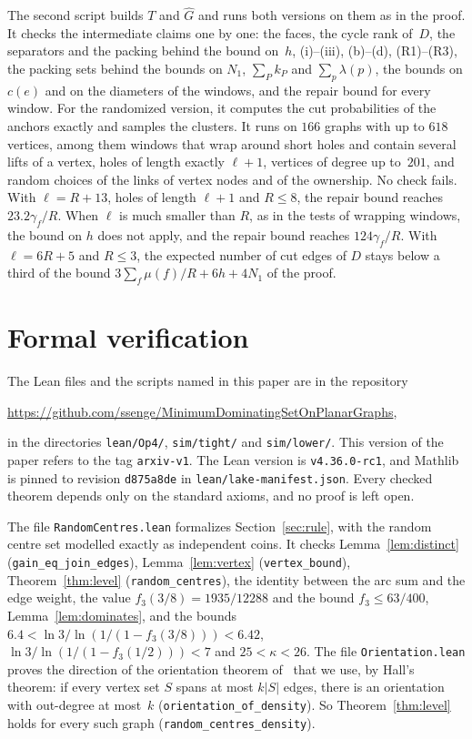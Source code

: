 \documentclass[11pt]{article}
\theoremstyle{remark}
\begin{document}
The second script builds $T$ and $\hat G$ and runs both versions on them as in the proof. It checks
the intermediate claims one by one: the faces, the cycle rank of~$D$, the separators and the packing
behind the bound on~$h$, (i)--(iii), (b)--(d), (R1)--(R3), the packing sets behind the bounds on
$N_1$, $\sum_Pk_P$ and $\sum_p\lambda(p)$, the bounds on $c(e)$ and on the diameters of the windows,
and the repair bound for every window. For the randomized version, it computes the cut probabilities
of the anchors exactly and samples the clusters. It runs on $166$ graphs with up to $618$ vertices,
among them windows that wrap around short holes and contain several lifts of a vertex, holes of
length exactly $\ell+1$, vertices of degree up to~$201$, and random choices of the links of vertex
nodes and of the ownership. No check fails. With $\ell=R+13$, holes of length $\ell+1$ and $R\le8$,
the repair bound reaches $23.2\gamma_f/R$. When $\ell$ is much smaller than $R$, as in the tests of
wrapping windows, the bound on $h$ does not apply, and the repair bound reaches $124\gamma_f/R$. With
$\ell=6R+5$ and $R\le3$, the expected number of cut edges of $D$ stays below a third of the bound
$3\sum_f\mu(f)/R+6h+4N_1$ of the proof.

\section{Formal verification}\label{sec:lean}

The Lean files and the scripts named in this paper are in the repository
\begin{center}
  \url{https://github.com/ssenge/MinimumDominatingSetOnPlanarGraphs},
\end{center}
in the directories \texttt{lean/Op4/}, \texttt{sim/tight/} and \texttt{sim/lower/}. This version of
the paper refers to the tag \texttt{arxiv-v1}. The Lean version is \texttt{v4.36.0-rc1}, and Mathlib
is pinned to revision \texttt{d875a8de} in \texttt{lean/lake-manifest.json}.
Every checked theorem depends only on the standard axioms, and no proof is left open.

The file \texttt{RandomCentres.lean} formalizes Section~\ref{sec:rule}, with the random centre set
modelled exactly as independent coins. It checks Lemma~\ref{lem:distinct}
(\texttt{gain\_eq\_join\_edges}),
Lemma~\ref{lem:vertex} (\texttt{vertex\_bound}), Theorem~\ref{thm:level} (\texttt{random\_centres}),
the identity between the arc sum and the edge weight, the value
$f_3(3/8)=1935/12288$ and the bound $f_3\le 63/400$, Lemma~\ref{lem:dominates}, and the bounds
$6.4<\ln3/\ln(1/(1-f_3(3/8)))<6.42$, $\ln3/\ln(1/(1-f_3(1/2)))<7$ and $25<\kappa<26$. The file
\texttt{Orientation.lean} proves the direction of the orientation theorem of~\cite{H65} that we use,
by Hall's theorem: if every vertex set $S$ spans at most $k|S|$ edges, there is an orientation with
out-degree at most~$k$ (\texttt{orientation\_of\_density}). So Theorem~\ref{thm:level} holds for
every such graph (\texttt{random\_centres\_density}).
\end{document}
